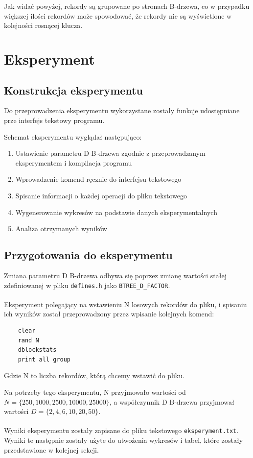 \documentclass[12pt]{article}
\begin{document}
Jak widać powyżej, rekordy są grupowane po stronach B-drzewa, co w przypadku większej ilości rekordów może spowodować,
że rekordy nie są wyświetlone w kolejności rosnącej klucza.

\section{Eksperyment}
\subsection{Konstrukcja eksperymentu}
Do przeprowadzenia eksperymentu wykorzystane zostały funkcje udostępniane prze interfejs
tekstowy programu.

Schemat eksperymentu wyglądał następująco:

\begin{enumerate}
    \item Ustawienie parametru D B-drzewa zgodnie z przeprowadzanym eksperymentem i kompilacja programu
    \item Wprowadzenie komend ręcznie do interfejsu tekstowego
    \item Spisanie informacji o każdej operacji do pliku tekstowego
    \item Wygenerowanie wykresów na podstawie danych eksperymentalnych
    \item Analiza otrzymanych wyników
\end{enumerate}

\subsection{Przygotowania do eksperymentu}

Zmiana parametru D B-drzewa odbywa się poprzez zmianę wartości stałej zdefiniowanej w pliku \texttt{defines.h}
jako \verb!BTREE_D_FACTOR!.
\\\\
Eksperyment polegający na wstawieniu N losowych rekordów do pliku, i spisaniu ich wyników został przeprowadzony
przez wpisanie kolejnych komend:
\begin{verbatim}
    clear
    rand N
    dblockstats
    print all group
\end{verbatim}
Gdzie N to liczba rekordów, którą chcemy wstawić do pliku.

Na potrzeby tego eksperymentu, N przyjmowało wartości od \(N = \{250, 1000, 2500, 10000, 25000 \} \),
a współczynnik D B-drzewa przyjmował wartości \(D = \{2, 4, 6, 10, 20, 50 \}\).
\\\\
Wyniki eksperymentu zostały zapisane do pliku tekstowego \texttt{eksperyment.txt}.
Wyniki te następnie zostały użyte do utwożenia wykresów i tabel, które zostały przedstawione w kolejnej sekcji.
\end{document}
